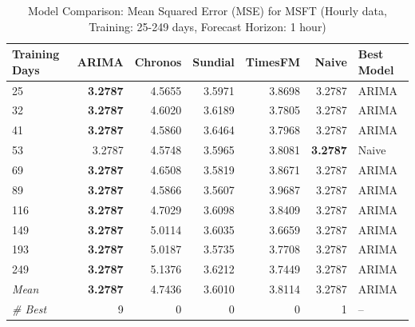 \begin{table}[htbp]
\centering
\caption{Model Comparison: Mean Squared Error (MSE) for MSFT (Hourly data, Training: 25-249 days, Forecast Horizon: 1 hour)}
\label{tab:comparison_MSFT_1h_train-less-year-log_h1_MSE}
\small
\begin{tabular}{lrrrrrl}
\toprule
Training Days & ARIMA & Chronos & Sundial & TimesFM & Naive & Best Model \\
\midrule
25 & \textbf{3.2787} & 4.5655 & 3.5971 & 3.8698 & 3.2787 & ARIMA \\
32 & \textbf{3.2787} & 4.6020 & 3.6189 & 3.7805 & 3.2787 & ARIMA \\
41 & \textbf{3.2787} & 4.5860 & 3.6464 & 3.7968 & 3.2787 & ARIMA \\
53 & 3.2787 & 4.5748 & 3.5965 & 3.8081 & \textbf{3.2787} & Naive \\
69 & \textbf{3.2787} & 4.6508 & 3.5819 & 3.8671 & 3.2787 & ARIMA \\
89 & \textbf{3.2787} & 4.5866 & 3.5607 & 3.9687 & 3.2787 & ARIMA \\
116 & \textbf{3.2787} & 4.7029 & 3.6098 & 3.8409 & 3.2787 & ARIMA \\
149 & \textbf{3.2787} & 5.0114 & 3.6035 & 3.6659 & 3.2787 & ARIMA \\
193 & \textbf{3.2787} & 5.0187 & 3.5735 & 3.7708 & 3.2787 & ARIMA \\
249 & \textbf{3.2787} & 5.1376 & 3.6212 & 3.7449 & 3.2787 & ARIMA \\
\midrule
\textit{Mean} & \textbf{3.2787} & 4.7436 & 3.6010 & 3.8114 & 3.2787 & ARIMA \\
\textit{\# Best} & 9 & 0 & 0 & 0 & 1 & -- \\
\bottomrule
\end{tabular}
\end{table}